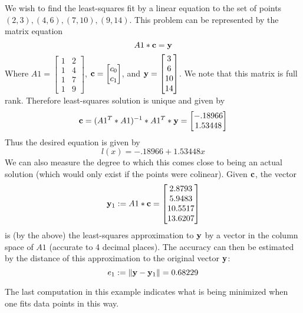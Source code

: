 \documentclass{ximera}
\begin{document}
\begin{example} We wish to find the least-squares fit by a linear equation to the set of points $(2,3), (4,6), (7,10), (9,14)$. This problem can be represented by the matrix equation
\[
A1*{\bf c} = {\bf y}
\]
Where $A1 = \begin{bmatrix} 1 & 2\\1 & 4\\1 & 7\\1 & 9\end{bmatrix}$, ${\bf c} = \begin{bmatrix}c_0\\c_1\end{bmatrix}$, and ${\bf y} = \begin{bmatrix} 3\\6\\10\\14\end{bmatrix}$. We note that this matrix is full rank. Therefore least-squares solution is unique and given by
\[
{\bf c} = (A1^T*A1)^{-1}*A1^T*{\bf y} = \begin{bmatrix}-.18966\\ 1.53448\end{bmatrix}
\]
Thus the desired equation is given by
\[
l(x) = -.18966 + 1.53448 x
\]
We can also measure the degree to which this comes close to being an actual solution (which would only exist if the points were colinear). Given $\bf c$, the vector
\[
{\bf y}_1 := A1*{\bf c} = \begin{bmatrix} 2.8793\\ 5.9483\\ 10.5517\\ 13.6207\end{bmatrix}
\]
is (by the above) the least-squares approximation to $\bf y$ by a vector in the column space of $A1$ (accurate to 4 decimal places). The accuracy can then be estimated by the distance of this approximation to the original vector $\bf y$:
\[
e_1 := \|{\bf y} - {\bf y}_1\| = 0.68229
\]
\end{example}

The last computation in this example indicates what is being minimized when one fits data points in this way.
\end{document}

